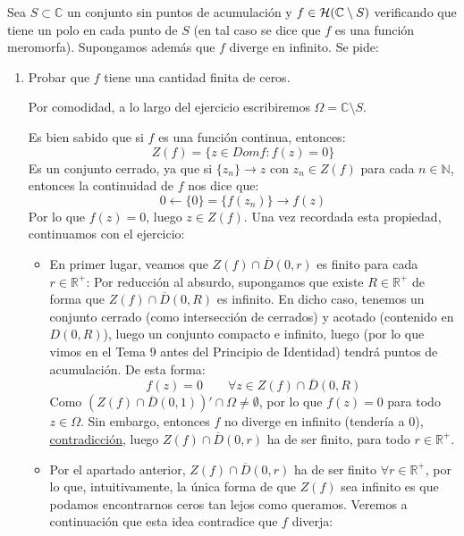 \documentclass[12pt]{article}
\begin{document}
    \begin{ejercicio}[2.5 puntos]
        Sea $S\subset \mathbb{C}$ un conjunto sin puntos de acumulación y $f\in \mathcal{H}(\mathbb{C}\setminus S)$ verificando que tiene un polo en cada punto de $S$ (en tal caso se dice que $f$ es una función meromorfa). Supongamos además que $f$ diverge en infinito. Se pide:
        \begin{enumerate}[label=\alph*)]
            \item Probar que $f$ tiene una cantidad finita de ceros.

                Por comodidad, a lo largo del ejercicio escribiremos $\Omega=\mathbb{C}\setminus S$.

                Es bien sabido que si $f$ es una función continua, entonces:
                \begin{equation*}
                    Z(f) = \{z\in Dom f : f(z) = 0\}
                \end{equation*}
                Es un conjunto cerrado, ya que si $\{z_n\}\to z$ con $z_n\in Z(f)$ para cada $n\in \mathbb{N}$, entonces la continuidad de $f$ nos dice que:
                \begin{equation*}
                    0 \leftarrow \{0\} = \{f(z_n)\} \to f(z)
                \end{equation*}
                Por lo que $f(z) = 0$, luego $z\in Z(f)$. Una vez recordada esta propiedad, continuamos con el ejercicio:

                \begin{itemize}
                    \item En primer lugar, veamos que $Z(f)\cap \overline{D}(0,r)$ es finito para cada $r\in \mathbb{R}^+$: Por reducción al absurdo, supongamos que existe $R\in \mathbb{R}^+$ de forma que $Z(f)\cap \overline{D}(0,R)$ es infinito. En dicho caso, tenemos un conjunto cerrado (como intersección de cerrados) y acotado (contenido en $D(0,R)$), luego un conjunto compacto e infinito, luego (por lo que vimos en el Tema 9 antes del Principio de Identidad) tendrá puntos de acumulación. De esta forma:
                        \begin{equation*}
                            f(z) = 0 \qquad \forall z\in Z(f)\cap \overline{D}(0,R)
                        \end{equation*}
                        Como $(Z(f)\cap \overline{D}(0,1))' \cap \Omega \neq \emptyset $, por lo que $f(z) = 0$ para todo $z\in \Omega$. Sin embargo, entonces $f$ no diverge en infinito (tendería a 0), \underline{contradicción}, luego $Z(f)\cap \overline{D}(0,r)$ ha de ser finito, para todo $r\in \mathbb{R}^+$.
                    \item Por el apartado anterior, $Z(f)\cap \overline{D}(0,r)$ ha de ser finito $\forall r\in \mathbb{R}^+$, por lo que, intuitivamente, la única forma de que $Z(f)$ sea infinito es que podamos encontrarnos ceros tan lejos como queramos. Veremos a continuación que esta idea contradice que $f$ diverja:


\end{itemize}
\end{enumerate}
\end{ejercicio}
\end{document}
